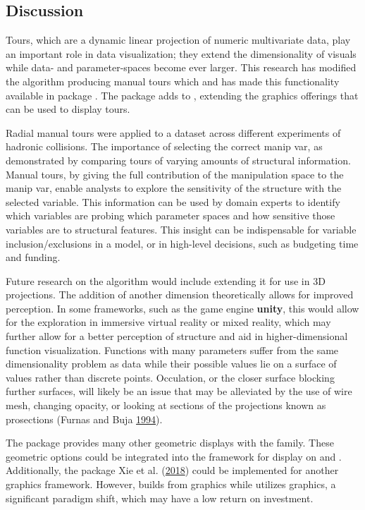 \hypertarget{sec:discussion}{%
\subsection{Discussion}\label{sec:discussion}}

Tours, which are a dynamic linear projection of numeric multivariate
data, play an important role in data visualization; they extend the
dimensionality of visuals while data- and parameter-spaces become ever
larger. This research has modified the algorithm producing manual tours
which and has made this functionality available in package
. The package adds to , extending the graphics
offerings that can be used to display tours.

Radial manual tours were applied to a dataset across different
experiments of hadronic collisions. The importance of selecting the
correct manip var, as demonstrated by comparing tours of varying amounts
of structural information. Manual tours, by giving the full contribution
of the manipulation space to the manip var, enable analysts to explore
the sensitivity of the structure with the selected variable. This
information can be used by domain experts to identify which variables
are probing which parameter spaces and how sensitive those variables are
to structural features. This insight can be indispensable for variable
inclusion/exclusions in a model, or in high-level decisions, such as
budgeting time and funding.

Future research on the algorithm would include extending it for use in
3D projections. The addition of another dimension theoretically allows
for improved perception. In some frameworks, such as the game engine
\textbf{unity}, this would allow for the exploration in immersive
virtual reality or mixed reality, which may further allow for a better
perception of structure and aid in higher-dimensional function
visualization. Functions with many parameters suffer from the same
dimensionality problem as data while their possible values lie on a
surface of values rather than discrete points. Occulation, or the closer
surface blocking further surfaces, will likely be an issue that may be
alleviated by the use of wire mesh, changing opacity, or looking at
sections of the projections known as prosections (Furnas and Buja
\protect\hyperlink{ref-furnas_prosection_1994}{1994}).

The  package provides many other geometric displays with the
 family. These geometric options could be
integrated into the  framework for display on 
and . Additionally, the  package Xie
et al. (\protect\hyperlink{ref-xie_animation:_2018}{2018}) could be
implemented for another graphics framework. However, 
builds from  graphics while  utilizes
 graphics, a significant paradigm shift, which may have a
low return on investment.

